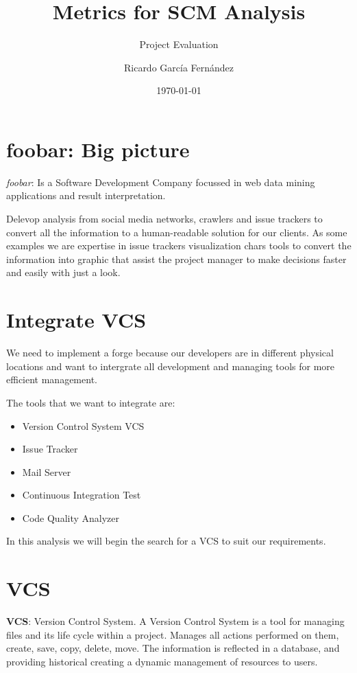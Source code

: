 \documentclass[11pt]{scrartcl}
\title{\textbf{Metrics for SCM Analysis}}
\subtitle{Project Evaluation}
\author{Ricardo García Fernández}
\date{\today}
\begin{document}
\maketitle

\tableofcontents

\newpage

\section{foobar: Big picture}

\emph{foobar}: Is a Software Development Company focussed in web data mining applications and result interpretation.

\par Delevop analysis from social media networks, crawlers and issue trackers to convert all the information to a human-readable solution for our clients. As some examples we are expertise in issue trackers visualization chars tools to convert the information into graphic that assist the project manager to make decisions faster and easily with just a look.

\section{Integrate VCS}

We need to implement a forge because our developers are in different physical locations and want to intergrate all development and managing tools for more efficient management.

The tools that we want to integrate are:

\begin{itemize}
    \item Version Control System VCS
    \item Issue Tracker
    \item Mail Server
    \item Continuous Integration Test
    \item Code Quality Analyzer
\end{itemize}

In this analysis we will begin the search for a VCS to suit our requirements.

\section{VCS}

\par \textbf{VCS}: Version Control System. A Version Control System is a tool for managing files and its life cycle within a project. Manages all actions performed on them, create, save, copy, delete, move. The information is reflected in a database, and providing historical creating a dynamic management of resources to users.
\end{document}
